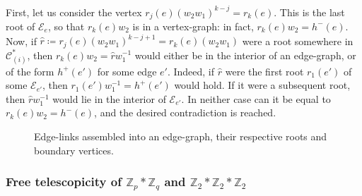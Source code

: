 \documentclass[ALCO,ThmDefs,Unicode,epreuves]{cedram}
\newcommand{\ZZ}{\mathbb{Z}}
\newcommand{\cC}{\mathcal{C}}
\newcommand{\cE}{\mathcal{E}}
\begin{document}
\begin{enumerate}[S.\arabic*]
First, let us consider the vertex $r_j(e)(w_{2}w_{1})^{k-j} = r_k(e)$. This is the last root of $\cE_e$, so that $r_k(e)w_{2}$ is in a vertex-graph: in fact, $r_k(e)w_{2}=h^-(e)$. Now, if $\widehat{r} \coloneqq r_j(e)(w_{2}w_{1})^{k-j+1} = r_k(e)(w_{2}w_{1})$ were a root somewhere in $\cC^*_{(i)}$, then $r_k(e)w_{2} = \widehat{r}w_{1}^{-1}$ would either be in the interior of an edge-graph, or of the form $h^+(e')$ for some edge $e'$. Indeed, if $\widehat{r}$ were the first root $r_1(e')$ of some $\cE_{e'}$, then $r_1(e')w_{1}^{-1} = h^+(e')$ would hold. If it were a subsequent root, then $\widehat{r}w_{1}^{-1}$ would lie in the interior of $\cE_{e'}$. In neither case can it be equal to $r_k(e)w_{2} = h^-(e)$, and the desired contradiction is reached.
\end{enumerate}

\begin{figure}[htb]
\centering
\caption{Edge-links assembled into an edge-graph, their respective roots and boundary vertices.}\label{fig:edge-graph-embedding}
\end{figure}

 
\subsubsection{Free telescopicity of $\ZZ_p*\ZZ_q$ and $\ZZ_{2}*\ZZ_{2}*\ZZ_{2}$}\label{sssection:proof-of-telescopicity}
\end{document}
